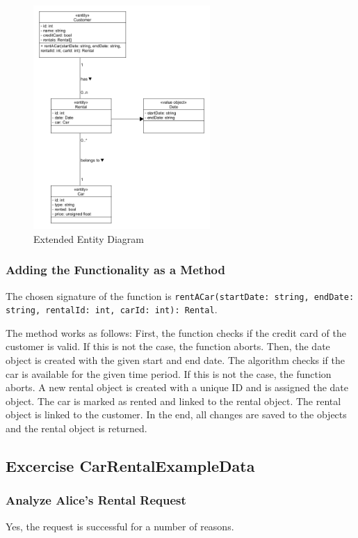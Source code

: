 \begin{figure}[h]
    \centering
    \includegraphics[width=0.6\textwidth]{figures/goLang/carRental/carRental_extendedEntity.png}
    \caption{Extended Entity Diagram}
    \label{fig:extendedEntityDiagram}
\end{figure}

\subsubsection*{Adding the Functionality as a Method}
The chosen signature of the function is \texttt{rentACar(startDate: string, endDate: string, rentalId: int, carId: int): Rental}.

The method works as follows:
First, the function checks if the credit card of the customer is valid.
If this is not the case, the function aborts.
Then, the date object is created with the given start and end date.
The algorithm checks if the car is available for the given time period.
If this is not the case, the function aborts.
A new rental object is created with a unique ID and is assigned the date object.
The car is marked as rented and linked to the rental object.
The rental object is linked to the customer.
In the end, all changes are saved to the objects and the rental object is returned.

\subsection{Excercise CarRentalExampleData}
\label{sec:exercise_car_rental_example_data}
\subsubsection*{Analyze Alice's Rental Request}
Yes, the request is successful for a number of reasons.

